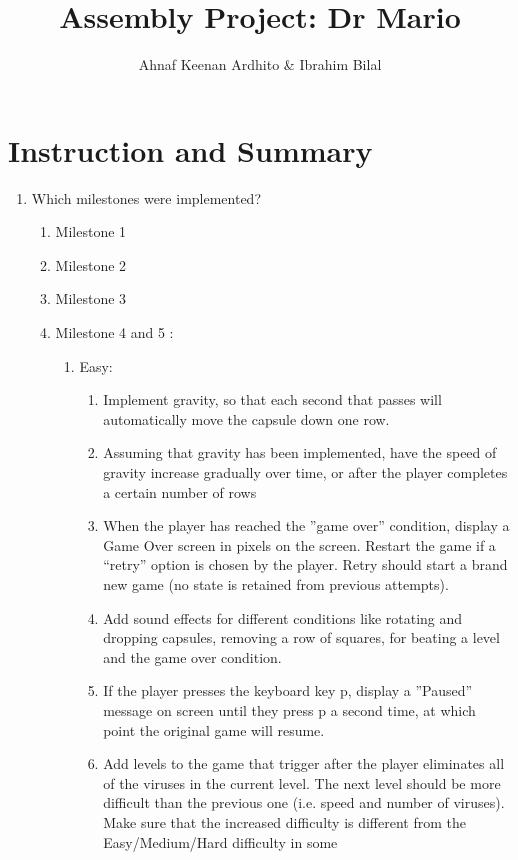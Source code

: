 \documentclass{article}
\title{Assembly Project: Dr Mario}
\author{Ahnaf Keenan Ardhito & Ibrahim Bilal}
\begin{document}
\maketitle

\section{Instruction and Summary}

\begin{enumerate}

    \item Which milestones were implemented? 
    \begin{enumerate}
        \item Milestone 1
        \item Milestone 2
        \item Milestone 3
        \item Milestone 4 and 5 :
        \begin{enumerate}
            \item Easy:
            \begin{enumerate}
                \item Implement gravity, so that each second that passes will automatically move the capsule down one
row.
                \item Assuming that gravity has been implemented, have the speed of gravity increase gradually over
time, or after the player completes a certain number of rows
                \item When the player has reached the ”game over” condition, display a Game Over screen in pixels
on the screen. Restart the game if a “retry” option is chosen by the player. Retry should start a
brand new game (no state is retained from previous attempts).
                \item Add sound effects for different conditions like rotating and dropping capsules, removing a row of
squares, for beating a level and the game over condition.
                \item If the player presses the keyboard key p, display a ”Paused” message on screen until they press
p a second time, at which point the original game will resume.
                \item Add levels to the game that trigger after the player eliminates all of the viruses in the current level.
The next level should be more difficult than the previous one (i.e. speed and number of viruses).
Make sure that the increased difficulty is different from the Easy/Medium/Hard difficulty in some

\end{enumerate}
\end{enumerate}
\end{enumerate}
\end{enumerate}
\end{document}
